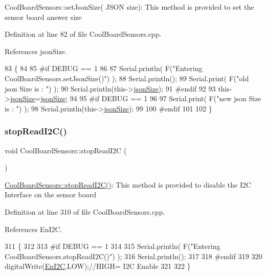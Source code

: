 Cool\+Board\+Sensors\+::set\+Json\+Size( J\+S\+O\+N size)\+: This method is provided to set the sensor board answer size 

Definition at line 82 of file Cool\+Board\+Sensors.\+cpp.



References json\+Size.


\begin{DoxyCode}
83 \{
84 
85 \textcolor{preprocessor}{#if DEBUG == 1}
86 
87     Serial.println( F(\textcolor{stringliteral}{"Entering CoolBoardSensors.setJsonSize()"}) );
88     Serial.println();   
89     Serial.print( F(\textcolor{stringliteral}{"old json Size is : "}) );
90     Serial.println(this->\hyperlink{classCoolBoardSensors_a05a40dc80bfff14ffb830f549b876f8d}{jsonSize});
91 \textcolor{preprocessor}{#endif}
92         
93     this->\hyperlink{classCoolBoardSensors_a05a40dc80bfff14ffb830f549b876f8d}{jsonSize}=\hyperlink{classCoolBoardSensors_a05a40dc80bfff14ffb830f549b876f8d}{jsonSize};
94 
95 \textcolor{preprocessor}{#if DEBUG == 1 }
96     
97     Serial.print( F(\textcolor{stringliteral}{"new json Size is : "}) );
98     Serial.println(this->\hyperlink{classCoolBoardSensors_a05a40dc80bfff14ffb830f549b876f8d}{jsonSize});
99 
100 \textcolor{preprocessor}{#endif}
101     
102 \}
\end{DoxyCode}
\mbox{\label{classCoolBoardSensors_ab67b900b9e5e7c18d52d2d9107ba171b}} 
\subsubsection{\texorpdfstring{stop\+Read\+I2\+C()}{stopReadI2C()}}
{\footnotesize\ttfamily void Cool\+Board\+Sensors\+::stop\+Read\+I2C (\begin{DoxyParamCaption}{ }\end{DoxyParamCaption})}

\hyperlink{classCoolBoardSensors_ab67b900b9e5e7c18d52d2d9107ba171b}{Cool\+Board\+Sensors\+::stop\+Read\+I2\+C()}\+: This method is provided to disable the I2C Interface on the sensor board 

Definition at line 310 of file Cool\+Board\+Sensors.\+cpp.



References En\+I2C.


\begin{DoxyCode}
311 \{
312 
313 \textcolor{preprocessor}{#if DEBUG == 1}
314 
315     Serial.println( F(\textcolor{stringliteral}{"Entering CoolBoardSensors.stopReadI2C()"}) );
316     Serial.println();
317 
318 \textcolor{preprocessor}{#endif}
319 
320     digitalWrite(\hyperlink{classCoolBoardSensors_aaa6b5dbf3a6633bffd9d204d961096dc}{EnI2C},LOW);\textcolor{comment}{//HIGH= I2C Enable}
321 
322 \}
\end{DoxyCode}


